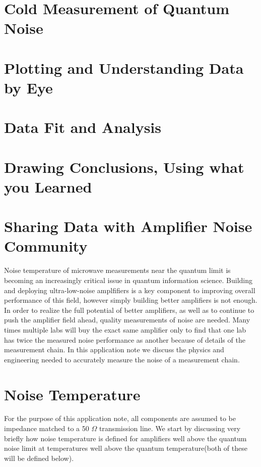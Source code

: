 \documentclass[11pt]{article}
\begin{document}
\section{
Cold Measurement of Quantum Noise}


\section{
Plotting and Understanding Data by Eye}


\section{
Data Fit and Analysis}


\section{
Drawing Conclusions, Using what you Learned}



\section{
Sharing Data with Amplifier Noise Community}



	Noise temperature of microwave measurements near the quantum limit is becoming an increasingly critical issue in quantum information science.  Building and deploying ultra-low-noise amplfifiers is a key component to improving overall performance of this field, however simply building better amplifiers is not enough.  In order to realize the full potential of better amplifiers, as well as to continue to push the amplifier field ahead, quality measurements of noise are needed.   Many times multiple labs will buy the exact same amplifier only to find that one lab has twice the measured noise performance as another because of details of the measurement chain.  In this application note we discuss the physics and engineering needed to accurately measure the noise of a measurement chain.


\section{
Noise Temperature}



    		For the purpose of this application note, all components are assumed to be impedance matched to a 50 $\Omega$ transmission line.  We start by discussing very briefly how noise temperature is defined for amplifiers well above the quantum noise limit at temperatures well above the quantum temperature(both of these will be defined below).  
\end{document}
